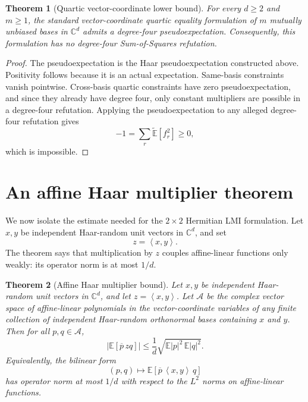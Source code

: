 \documentclass[11pt]{article}
\newtheorem{theorem}{Theorem}[section]
\theoremstyle{remark}
\newcommand{\C}{\mathbb{C}}
\newcommand{\E}{\mathbb{E}}
\newcommand{\Et}{\widetilde{\mathbb{E}}}
\newcommand{\ip}[2]{\left\langle #1,#2\right\rangle}
\begin{document}
\begin{theorem}[Quartic vector-coordinate lower bound]\label{thm:quartic}
For every $d\ge2$ and $m\ge1$, the standard vector-coordinate quartic equality formulation of $m$ mutually unbiased bases in $\C^d$ admits a degree-four pseudoexpectation. Consequently, this formulation has no degree-four Sum-of-Squares refutation.
\end{theorem}

\begin{proof}
The pseudoexpectation is the Haar pseudoexpectation constructed above. Positivity follows because it is an actual expectation. Same-basis constraints vanish pointwise. Cross-basis quartic constraints have zero pseudoexpectation, and since they already have degree four, only constant multipliers are possible in a degree-four refutation. Applying the pseudoexpectation to any alleged degree-four refutation gives
\[
-1=\sum_r \Et[f_r^2]\ge0,
\]
which is impossible.
\end{proof}

\section{An affine Haar multiplier theorem}

We now isolate the estimate needed for the $2\times2$ Hermitian LMI formulation. Let $x,y$ be independent Haar-random unit vectors in $\C^d$, and set
\[
z=\ip{x}{y}.
\]
The theorem says that multiplication by $z$ couples affine-linear functions only weakly: its operator norm is at most $1/d$.

\begin{theorem}[Affine Haar multiplier bound]\label{thm:affine-multiplier}
Let $x,y$ be independent Haar-random unit vectors in $\C^d$, and let $z=\ip{x}{y}$. Let $\mathcal A$ be the complex vector space of affine-linear polynomials in the vector-coordinate variables of any finite collection of independent Haar-random orthonormal bases containing $x$ and $y$. Then for all $p,q\in\mathcal A$,
\[
\left|\E[\overline p\,zq]\right|
\le
\frac1d
\sqrt{\E|p|^2\,\E|q|^2}.
\]
Equivalently, the bilinear form
\[
(p,q)\longmapsto \E[\overline p\,\ip{x}{y}\,q]
\]
has operator norm at most $1/d$ with respect to the $L^2$ norms on affine-linear functions.
\end{theorem}
\end{document}
